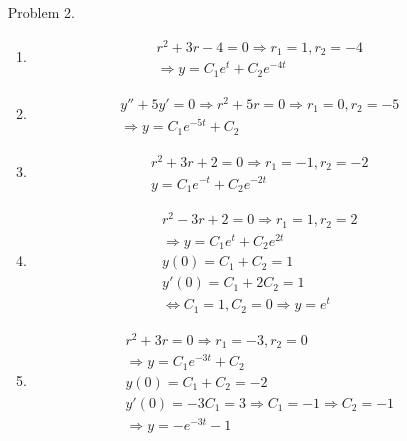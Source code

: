 \documentclass[10pt,a4paper]{article}
\begin{document}
\begin{enumerate}
\item[Problem 2.]
\begin{enumerate}
\item \begin{align*}
r^2 + 3r - 4 = 0 \Rightarrow r_1 = 1, r_2 = -4 \\
\Rightarrow y = C_1 e^t + C_2 e^{-4t} 
\end{align*}
\item \begin{align*}
y'' + 5y' = 0 \Rightarrow r^2 + 5r = 0 \Rightarrow r_1 = 0, r_2 = -5\\
\Rightarrow y = C_1 e^{-5t} + C_2
\end{align*}
\item \begin{align*}
r^2 + 3r + 2 = 0 \Rightarrow r_1 = -1, r_2 =  -2 \\
y = C_1 e^{-t} + C_2 e^{-2t}
\end{align*}
\item \begin{align*}
r^2 - 3r + 2 = 0 \Rightarrow r_1=1, r_2 =2\\
\Rightarrow y = C_1 e^t + C_2 e^{2t} \\
y(0) = C_1 + C_2 = 1 \\
y'(0) = C_1 + 2C_2 = 1 \\
\Leftrightarrow C_1 = 1, C_2 = 0 \Rightarrow y = e^t
\end{align*}
\item \begin{align*}
r^2 + 3r = 0 \Rightarrow r_1 = -3, r_2 = 0 \\
\Rightarrow y = C_1 e^{-3t} + C_2 \\
y(0) = C_1 + C_2 = -2 \\
y'(0) = -3 C_1 = 3 \Rightarrow C_1 = -1 \Rightarrow C_2 = -1\\
\Rightarrow y = -e^{-3t} - 1
\end{align*}
\end{enumerate}
\end{enumerate}
\end{document}
